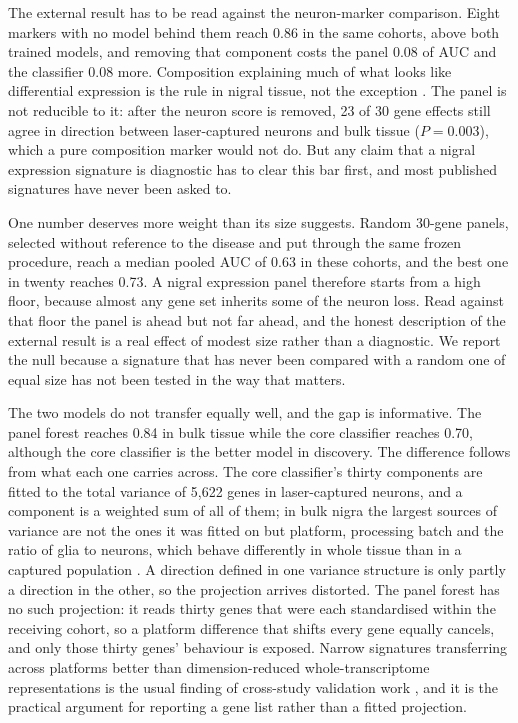 \documentclass[11pt,a4paper]{article}
\begin{document}
The external result has to be read against the neuron-marker comparison. Eight markers with no model behind
them reach 0.86 in the same cohorts, above both trained models, and removing that component costs the panel
0.08 of AUC and the classifier 0.08 more. Composition explaining much of what looks like differential
expression is the rule in nigral tissue, not the exception \citep{nido2020}. The panel is not reducible to it:
after the neuron score is removed, 23 of 30 gene effects still agree in direction between laser-captured
neurons and bulk tissue ($P=0.003$), which a pure composition marker would not do. But any claim that a nigral
expression signature is diagnostic has to clear this bar first, and most published signatures have never been
asked to.

One number deserves more weight than its size suggests. Random 30-gene panels, selected without reference to
the disease and put through the same frozen procedure, reach a median pooled AUC of 0.63 in these cohorts,
and the best one in twenty reaches 0.73. A nigral expression panel therefore starts from a high floor,
because almost any gene set inherits some of the neuron loss. Read against that floor the panel is ahead but
not far ahead, and the honest description of the external result is a real effect of modest size rather than
a diagnostic. We report the null because a signature that has never been compared with a random one of equal
size has not been tested in the way that matters.

The two models do not transfer equally well, and the gap is informative. The panel forest reaches 0.84 in bulk
tissue while the core classifier reaches 0.70, although the core classifier is the better model in discovery.
The difference follows from what each one carries across. The core classifier's thirty components are fitted to
the total variance of 5,622 genes in laser-captured neurons, and a component is a weighted sum of all of them;
in bulk nigra the largest sources of variance are not the ones it was fitted on but platform, processing batch
and the ratio of glia to neurons, which behave differently in whole tissue than in a captured population
\citep{leek2010,nido2020}. A direction defined in one variance structure is only partly a direction in the
other, so the projection arrives distorted. The panel forest has no such projection: it reads thirty genes
that were each standardised within the receiving cohort, so a platform difference that shifts every gene
equally cancels, and only those thirty genes' behaviour is exposed. Narrow signatures transferring across
platforms better than dimension-reduced whole-transcriptome representations is the usual finding of
cross-study validation work \citep{bernau2014}, and it is the practical argument for reporting a gene list
rather than a fitted projection.
\end{document}
